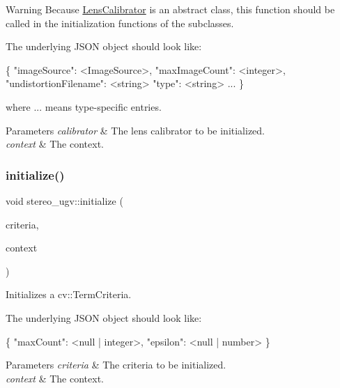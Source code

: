\begin{DoxyWarning}{Warning}
Because \hyperlink{classstereo__ugv_1_1LensCalibrator}{Lens\+Calibrator} is an abstract class, this function should be called in the initialization functions of the subclasses.
\end{DoxyWarning}
The underlying J\+S\+ON object should look like\+: 
\begin{DoxyCode}
\{
  \textcolor{stringliteral}{"imageSource"}: <ImageSource>,
  \textcolor{stringliteral}{"maxImageCount"}: <integer>,
  \textcolor{stringliteral}{"undistortionFilename"}: <\textcolor{keywordtype}{string}>
  \textcolor{stringliteral}{"type"}: <\textcolor{keywordtype}{string}>
  ...
\}
\end{DoxyCode}
 where ... means type-\/specific entries. 
\begin{DoxyParams}{Parameters}
{\em calibrator} & The lens calibrator to be initialized. \\
\hline
{\em context} & The context. \\
\hline
\end{DoxyParams}
\mbox{\label{namespacestereo__ugv_a0a98148c84d1f085ac51c2f2fb7c8e7a}} 
\subsubsection{\texorpdfstring{initialize()}{initialize()}\hspace{0.1cm}{\footnotesize\ttfamily [7/9]}}
{\footnotesize\ttfamily void stereo\+\_\+ugv\+::initialize (\begin{DoxyParamCaption}\item[{cv\+::\+Term\+Criteria $\ast$}]{criteria,  }\item[{const \hyperlink{classstereo__ugv_1_1Context}{Context} \&}]{context }\end{DoxyParamCaption})}



Initializes a cv\+::\+Term\+Criteria. 

The underlying J\+S\+ON object should look like\+: 
\begin{DoxyCode}
\{
  \textcolor{stringliteral}{"maxCount"}: <null | integer>,
  \textcolor{stringliteral}{"epsilon"}: <null | number>
\}
\end{DoxyCode}
 
\begin{DoxyParams}{Parameters}
{\em criteria} & The criteria to be initialized. \\
\hline
{\em context} & The context. \\
\hline
\end{DoxyParams}
\mbox{\label{namespacestereo__ugv_a8e8ff522fb8d2300fcdfc02ab0025e98}} 
